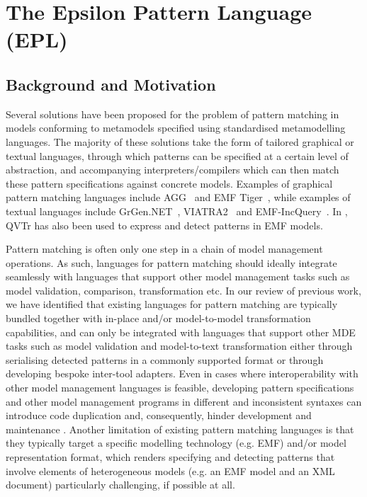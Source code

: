 \chapter{The Epsilon Pattern Language (EPL)}
\label{sec:EPL}

\section{Background and Motivation}
Several solutions have been proposed for the problem of pattern matching in models conforming to metamodels specified using standardised metamodelling languages. The majority of these solutions take the form of tailored graphical or textual languages, through which patterns can be specified at a certain level of abstraction, and accompanying interpreters/compilers which can then match these pattern specifications against concrete models. Examples of graphical pattern matching languages include AGG~\cite{AGG} and EMF Tiger~\cite{EMFTiger}, while examples of textual languages include GrGen.NET~\cite{GrGen}, VIATRA2~\cite{VIATRA2} and EMF-IncQuery~\cite{EMFIncQuery}. In \cite{QVTRPatterns}, QVTr has also been used to express and detect patterns in EMF models.

Pattern matching is often only one step in a chain of model management operations. As such, languages for pattern matching should ideally integrate seamlessly with languages that support other model management tasks such as model validation, comparison, transformation etc. In our review of previous work, we have identified that existing languages for pattern matching are typically bundled together with in-place and/or model-to-model transformation capabilities, and can only be integrated with languages that support other MDE tasks such as model validation and model-to-text transformation either through serialising detected patterns in a commonly supported format or through developing bespoke inter-tool adapters. Even in cases where interoperability with other model management languages is feasible, developing pattern specifications and other model management programs in different and inconsistent syntaxes can introduce code duplication and, consequently, hinder development and maintenance \cite{ICCECS09}. Another limitation of existing pattern matching languages is that they typically target a specific modelling technology (e.g. EMF) and/or model representation format, which renders specifying and detecting patterns that involve elements of heterogeneous models (e.g. an EMF model and an XML document) particularly challenging, if possible at all.

